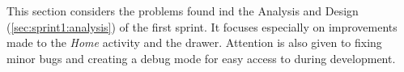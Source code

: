 This section considers the problems found ind the Analysis and Design (\cref{sec:sprint1:analysis}) of the first sprint.
It focuses especially on improvements made to the \textit{Home} activity and the drawer.
Attention is also given to fixing minor bugs and creating a debug mode for easy access to \launcher during development.
